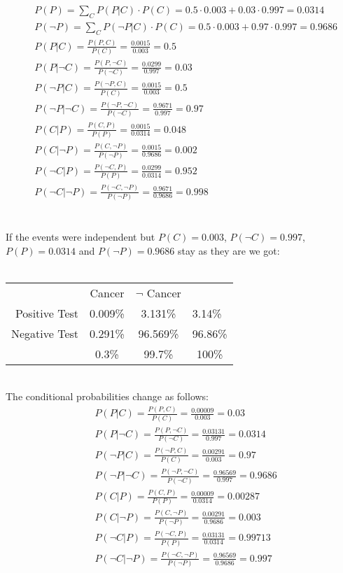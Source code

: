 \begin{align}
& P(P) = \sum_{C}{P(P|C) \cdot P(C)} = 0.5 \cdot 0.003 + 0.03 \cdot 0.997 = 0.0314\\
& P(\neg P) = \sum_{C}{P(\neg P|C) \cdot P(C)} = 0.5 \cdot 0.003 + 0.97 \cdot 0.997 = 0.9686\\ 
& P(P|C) = \frac{P(P,C)}{P(C)} = \frac{0.0015}{0.003} = 0.5 \\
& P(P|\neg C) = \frac{P(P,\neg C)}{P(\neg C)} = \frac{0.0299}{0.997} = 0.03 \\
& P(\neg P|C) = \frac{P(\neg P,C)}{P(C)} = \frac{0.0015}{0.003} = 0.5 \\
& P(\neg P|\neg C) = \frac{P(\neg P,\neg C)}{P(\neg C)} = \frac{0.9671}{0.997}= 0.97\\
& P(C|P) = \frac{P(C,P)}{P(P)} = \frac{0.0015}{0.0314} = 0.048 \\
& P(C|\neg P) = \frac{P(C,\neg P)}{P(\neg P)} = \frac{0.0015}{0.9686} = 0.002 \\
& P(\neg C|P) = \frac{P(\neg C,P)}{P(P)} = \frac{0.0299}{0.0314} = 0.952 \\
& P(\neg C|\neg P) = \frac{P(\neg C,\neg P)}{P(\neg P)} = \frac{0.9671}{0.9686}= 0.998 
\end{align}\\
\\
If the events were independent but $P(C)=0.003$, $P(\neg C)=0.997$, $P(P)=0.0314$ and $P(\neg P)=0.9686$ stay as they are we got:
\\
\\
\begin{tabular}{ r|c|c|l }
\multicolumn{1}{r}{}
 &  \multicolumn{1}{c}{Cancer}
 & \multicolumn{1}{c}{$\neg$ Cancer} \\
\cline{2-3}
Positive Test & 0.009\% & 3.131\% & 3.14\%\\ 
\cline{2-3}
Negative Test & 0.291\% & 96.569\% & 96.86\% \\
\cline{2-3}
\multicolumn{1}{r}{}
 &  \multicolumn{1}{c}{0.3\%}
 & \multicolumn{1}{c}{99.7\%}  & \multicolumn{1}{c}{100\%}\\
\end{tabular}\\
\newpage
The conditional probabilities change as follows:\\
\begin{align}
& P(P|C) = \frac{P(P,C)}{P(C)} = \frac{0.00009}{0.003} = 0.03 \\
& P(P|\neg C) = \frac{P(P,\neg C)}{P(\neg C)} = \frac{0.03131}{0.997} = 0.0314 \\
& P(\neg P|C) = \frac{P(\neg P,C)}{P(C)} = \frac{0.00291}{0.003} = 0.97 \\
& P(\neg P|\neg C) = \frac{P(\neg P,\neg C)}{P(\neg C)} = \frac{0.96569}{0.997}= 0.9686\\
& P(C|P) = \frac{P(C,P)}{P(P)} = \frac{0.00009}{0.0314} = 0.00287 \\
& P(C|\neg P) = \frac{P(C,\neg P)}{P(\neg P)} = \frac{0.00291}{0.9686} = 0.003 \\
& P(\neg C|P) = \frac{P(\neg C,P)}{P(P)} = \frac{0.03131}{0.0314} = 0.99713 \\
& P(\neg C|\neg P) = \frac{P(\neg C,\neg P)}{P(\neg P)} = \frac{0.96569}{0.9686}= 0.997 
\end{align}

